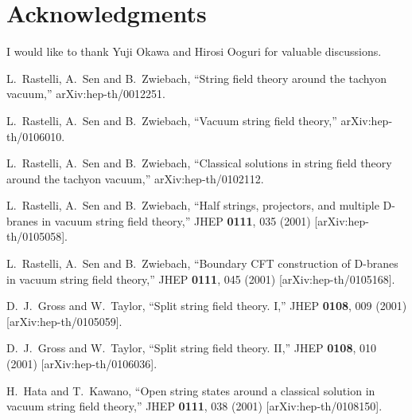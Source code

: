 \documentclass[a4paper,12pt]{article}
\begin{document}
\section*{Acknowledgments}
I would like to thank Yuji Okawa and Hirosi Ooguri for
valuable discussions.
\newpage


\renewcommand{\baselinestretch}{0.87}

\begingroup\raggedright\begin{thebibliography}{10}

L.~Rastelli, A.~Sen and B.~Zwiebach,
``String field theory around the tachyon vacuum,''
arXiv:hep-th/0012251.

L.~Rastelli, A.~Sen and B.~Zwiebach,
``Vacuum string field theory,''
arXiv:hep-th/0106010.


L.~Rastelli, A.~Sen and B.~Zwiebach,
``Classical solutions in string field theory around the tachyon vacuum,''
arXiv:hep-th/0102112.

L.~Rastelli, A.~Sen and B.~Zwiebach,
``Half strings, projectors, and multiple D-branes in vacuum string field  theory,''
JHEP {\bf 0111}, 035 (2001)
[arXiv:hep-th/0105058].

L.~Rastelli, A.~Sen and B.~Zwiebach,
``Boundary CFT construction of D-branes in vacuum string field theory,''
JHEP {\bf 0111}, 045 (2001)
[arXiv:hep-th/0105168].

D.~J.~Gross and W.~Taylor,
``Split string field theory. I,''
JHEP {\bf 0108}, 009 (2001)
[arXiv:hep-th/0105059].

D.~J.~Gross and W.~Taylor,
``Split string field theory. II,''
JHEP {\bf 0108}, 010 (2001)
[arXiv:hep-th/0106036].

H.~Hata and T.~Kawano,
``Open string states around a classical solution in vacuum string field  theory,''
JHEP {\bf 0111}, 038 (2001)
[arXiv:hep-th/0108150].


\end{thebibliography}
\end{document}
